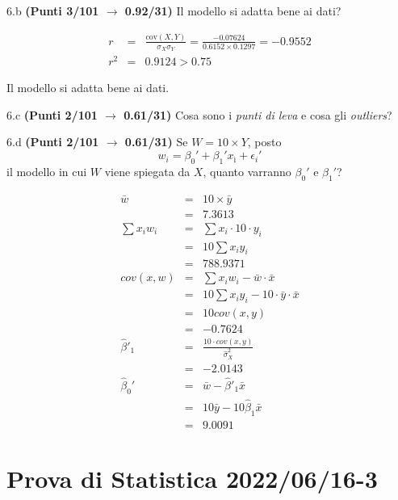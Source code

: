 \documentclass[
  11pt,
]{book}
\theoremstyle{mytheoremstyle}
\theoremstyle{mydefstyle}
\newenvironment{sol}
  {
  \begin{tcolorbox}[enhanced,breakable,arc=0.1mm,boxrule=1pt,colback=white,colframe=iblue,
  title=\bf \fontfamily{lmss}\selectfont \hspace{.5 cm} Soluzione,drop fuzzy shadow]

}{
\end{tcolorbox}
  }
\begin{document}
6.b \textbf{(Punti 3/101 \(\rightarrow\) 0.92/31)} Il modello si adatta bene ai dati?

\begin{sol}
\begin{eqnarray*}
r&=&\frac{\text{cov}(X,Y)}{\sigma_X\sigma_Y}=\frac{ -0.07624 }{ 0.6152 \times 0.1297 }= -0.9552 \\ 
r^2&=& 0.9124 > 0.75
\end{eqnarray*}

Il modello si adatta bene ai dati.

\end{sol}

6.c \textbf{(Punti 2/101 \(\rightarrow\) 0.61/31)} Cosa sono i \emph{punti di leva} e cosa gli \emph{outliers}?

6.d \textbf{(Punti 2/101 \(\rightarrow\) 0.61/31)} Se \(W=10\times Y\), posto
\[w_i=\beta_0'+\beta_1'x_ì +\epsilon_i'\]
il modello in cui \(W\) viene spiegata da \(X\), quanto varranno \(\beta_0'\) e \(\beta_1'\)?

\begin{sol}
\begin{eqnarray*}
  \bar w &=& 10\times \bar y\\
  &=& 7.3613\\
  \sum x_iw_i&=&\sum x_i\cdot 10\cdot y_i\\
  &=& 10\sum x_i y_i\\
  &=& 788.9371\\
  cov(x,w)&=&\sum x_iw_i-\bar w\cdot\bar x\\
  &=&10\sum x_i y_i - 10 \cdot\bar y\cdot\bar x\\
  &=&10 cov(x,y)\\
  &=& -0.7624\\
  \hat\beta'_1&=&\frac{10\cdot cov(x,y)}{\hat\sigma_X^2}\\
  &=&-2.0143\\
  \hat\beta_0'&=& \bar w -\hat\beta'_1\bar x\\
  &=&10\bar y - 10 \hat \beta_1\bar x\\
  &=&9.0091
\end{eqnarray*}

\end{sol}

\section{Prova di Statistica 2022/06/16-3}\label{prova-di-statistica-20220616-3}
\end{document}
